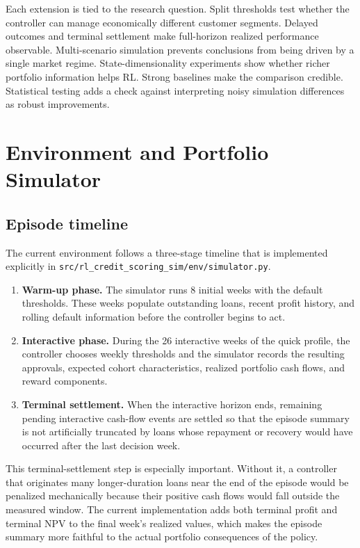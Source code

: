 \documentclass[12pt,a4paper]{article}
\begin{document}
Each extension is tied to the research question. Split thresholds test whether the controller can manage economically different customer segments. Delayed outcomes and terminal settlement make full-horizon realized performance observable. Multi-scenario simulation prevents conclusions from being driven by a single market regime. State-dimensionality experiments show whether richer portfolio information helps RL. Strong baselines make the comparison credible. Statistical testing adds a check against interpreting noisy simulation differences as robust improvements.

\section{Environment and Portfolio Simulator}

\subsection{Episode timeline}

The current environment follows a three-stage timeline that is implemented explicitly in \texttt{src/rl\_credit\_scoring\_sim/env/simulator.py}.
\begin{enumerate}[leftmargin=*]
    \item \textbf{Warm-up phase.} The simulator runs 8 initial weeks with the default thresholds. These weeks populate outstanding loans, recent profit history, and rolling default information before the controller begins to act.
    \item \textbf{Interactive phase.} During the 26 interactive weeks of the quick profile, the controller chooses weekly thresholds and the simulator records the resulting approvals, expected cohort characteristics, realized portfolio cash flows, and reward components.
    \item \textbf{Terminal settlement.} When the interactive horizon ends, remaining pending interactive cash-flow events are settled so that the episode summary is not artificially truncated by loans whose repayment or recovery would have occurred after the last decision week.
\end{enumerate}

This terminal-settlement step is especially important. Without it, a controller that originates many longer-duration loans near the end of the episode would be penalized mechanically because their positive cash flows would fall outside the measured window. The current implementation adds both terminal profit and terminal NPV to the final week's realized values, which makes the episode summary more faithful to the actual portfolio consequences of the policy.
\end{document}
